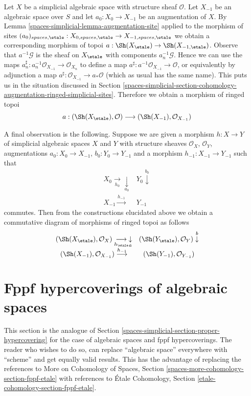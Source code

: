 \medskip\noindent
Let $X$ be a simplicial algebraic space with structure sheaf $\mathcal{O}$.
Let $X_{-1}$ be an algebraic space over $S$ and let $a_0 : X_0 \to X_{-1}$
be an augmentation of $X$. By
Lemma \ref{spaces-simplicial-lemma-augmentation-site}
applied to the morphism of sites
$(a_0)_{spaces, \etale} :
X_{0, spaces, \etale} \to X_{-1, spaces, \etale}$
we obtain a corresponding morphism of topoi
$a : \Sh(X_\etale) \to \Sh(X_{-1, \etale})$.
Observe that $a^{-1}\mathcal{G}$ is the sheaf on
$X_\etale$ with components $a_n^{-1}\mathcal{G}$. Hence we can use the maps
$a_n^\sharp : a_n^{-1}\mathcal{O}_{X_{-1}} \to \mathcal{O}_{X_n}$ to define
a map $a^\sharp : a^{-1}\mathcal{O}_{X_{-1}} \to \mathcal{O}$, or equivalently
by adjunction a map $a^\sharp : \mathcal{O}_{X_{-1}} \to a_*\mathcal{O}$
(which as usual has the same name). This puts us in the situation
discussed in
Section \ref{spaces-simplicial-section-cohomology-augmentation-ringed-simplicial-sites}.
Therefore we obtain a morphism of ringed topoi
$$
a :
(\Sh(X_\etale), \mathcal{O})
\longrightarrow
(\Sh(X_{-1}), \mathcal{O}_{X_{-1}})
$$

\medskip\noindent
A final observation is the following. Suppose we are given a morphism
$h : X \to Y$ of simplicial algebraic spaces $X$ and $Y$ with structure sheaves
$\mathcal{O}_X$, $\mathcal{O}_Y$, augmentations
$a_0 : X_0 \to X_{-1}$, $b_0 : Y_0 \to Y_{-1}$ and a morphism
$h_{-1} : X_{-1} \to Y_{-1}$ such that
$$
\begin{array}{cc}X_0 \underset{h_0}{\longrightarrow}\underset{a_0}{\downarrow} & Y_0 \overset{b_0}{\downarrow} \\ X_{-1} \overset{h_{-1}}{\longrightarrow} & Y_{-1}\end{array}
$$
commutes. Then from the constructions elucidated above
we obtain a commutative diagram of morphisms of ringed topoi as follows
$$
\begin{array}{cc}(\Sh(X_\etale), \mathcal{O}_X) \underset{h_\etale}{\longrightarrow}\underset{a}{\downarrow} & (\Sh(Y_\etale), \mathcal{O}_Y) \overset{b}{\downarrow} \\ (\Sh(X_{-1}), \mathcal{O}_{X_{-1}}) \overset{h_{-1}}{\longrightarrow} & (\Sh(Y_{-1}), \mathcal{O}_{Y_{-1}})\end{array}
$$

\section{Fppf hypercoverings of algebraic spaces}
\label{spaces-simplicial-section-fppf-hypercovering}
This section is the analogue of Section \ref{spaces-simplicial-section-proper-hypercovering}
for the case of algebraic spaces and fppf hypercoverings.
The reader who wishes to do so, can replace ``algebraic space''
everywhere with ``scheme'' and get equally valid results.
This has the advantage of replacing the references to
More on Cohomology of Spaces, Section
\ref{spaces-more-cohomology-section-fppf-etale}
with references to
\'Etale Cohomology, Section \ref{etale-cohomology-section-fppf-etale}.

